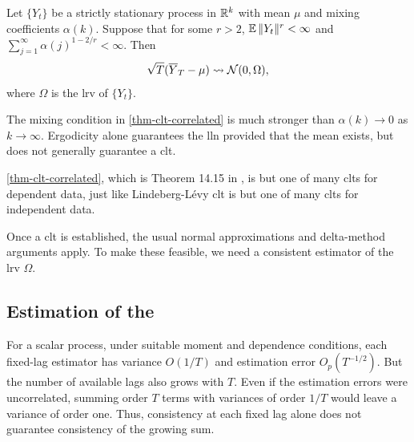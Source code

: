 \documentclass[a4paper,12pt]{article}
\begin{document}
\begin{theorem}\label{thm-clt-correlated}
	Let $\{Y_t\}$ be a strictly stationary process in $\mathbb{R}^k$ with mean $\mu$
	and mixing coefficients $\alpha(k)$.
	Suppose that for some $r>2$, $\operatorname{\mathbb{E}}\|Y_t\|^r<\infty$ and $\sum_{j=1}^{\infty}\alpha(j)^{1-2/r}<\infty$.
	Then
	\begin{align}
		\sqrt T(\overline Y_T-\mu)\overset{}{\leadsto}\operatorname{\mathcal{N}}(0,\Omega),
	\end{align}
	where $\Omega$ is the \gls{lrv} of $\{Y_t\}$.
\end{theorem}

\begin{remark}
	The mixing condition in \autoref{thm-clt-correlated} is much stronger than $\alpha(k)\to0$ as $k\to\infty$.
	Ergodicity alone guarantees the \gls{lln} provided that the mean exists,
	but does not generally guarantee a \gls{clt}.
\end{remark}

\begin{remark}
	\autoref{thm-clt-correlated},
	which is Theorem 14.15 in \textcite{hansen-econometrics},
	is but one of many \glspl{clt} for dependent data,
	just like Lindeberg-Lévy \gls{clt} is but one of many \glspl{clt} for independent data.
\end{remark}

\begin{remark}
	Once a \gls{clt} is established,
	the usual normal approximations and delta-method arguments apply.
	To make these feasible, we need a consistent estimator of the \gls{lrv} $\Omega$.
\end{remark}

\subsection{Estimation of the }

\begin{remark}
	For a scalar process, under suitable moment and dependence conditions,
	each fixed-lag estimator has variance $O(1/T)$ and estimation error $O_p(T^{-1/2})$.
	But the number of available lags also grows with $T$.
	Even if the estimation errors were uncorrelated,
	summing order $T$ terms with variances of order $1/T$ would leave a variance of order one.
	Thus, consistency at each fixed lag alone does not guarantee consistency of the growing sum.
\end{remark}
\end{document}
